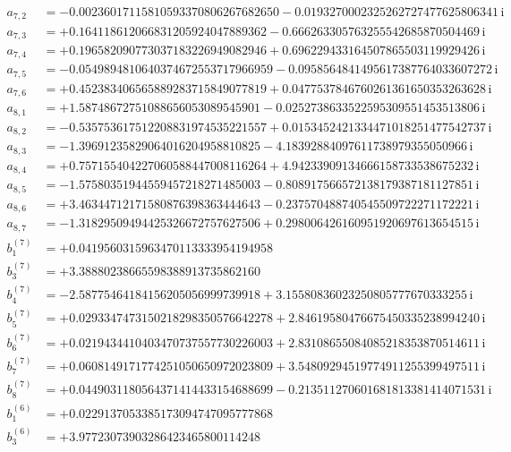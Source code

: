 {\begin{align*}
a_{7,2} &= -0.00236017115810593370806267682650 - 0.0193270002325262727477625806341\,\mathrm{i}\\
a_{7,3} &= +0.164118612066831205924047889362 - 0.666263305763255542685870504469\,\mathrm{i}\\
a_{7,4} &= +0.196582090773037183226949082946 + 0.696229433164507865503119929426\,\mathrm{i}\\
a_{7,5} &= -0.0549894810640374672553717966959 - 0.0958564841495617387764033607272\,\mathrm{i}\\
a_{7,6} &= +0.452383406565889283715849077819 + 0.0477537846760261361650353263628\,\mathrm{i}\\
a_{8,1} &= +1.58748672751088656053089545901 - 0.0252738633522595309551453513806\,\mathrm{i}\\
a_{8,2} &= -0.535753617512208831974535221557 + 0.0153452421334471018251477542737\,\mathrm{i}\\
a_{8,3} &= -1.39691235829064016204958810825 - 4.18392884097611738979355050966\,\mathrm{i}\\
a_{8,4} &= +0.757155404227060588447008116264 + 4.94233909134666158733538675232\,\mathrm{i}\\
a_{8,5} &= -1.57580351944559457218271485003 - 0.808917566572138179387181127851\,\mathrm{i}\\
a_{8,6} &= +3.46344712171580876398363444643 - 0.237570488740545509722271172221\,\mathrm{i}\\
a_{8,7} &= -1.31829509494425326672757627506 + 0.298006426160951920697613654515\,\mathrm{i}\\[1mm]
b^{(7)}_{1} &= +0.0419560315963470113333954194958\\
b^{(7)}_{3} &= +3.38880238665598388913735862160\\
b^{(7)}_{4} &= -2.58775464184156205056999739918 + 3.15580836023250805777670333255\,\mathrm{i}\\
b^{(7)}_{5} &= +0.0293347473150218298350576642278 + 2.84619580476675450335238994240\,\mathrm{i}\\
b^{(7)}_{6} &= +0.0219434410403470737557730226003 + 2.83108655084085218353870514611\,\mathrm{i}\\
b^{(7)}_{7} &= +0.0608149171774251050650972023809 + 3.54809294519774911255399497511\,\mathrm{i}\\
b^{(7)}_{8} &= +0.0449031180564371414433154688699 - 0.213511270601681813381414071531\,\mathrm{i}\\[1mm]
b^{(6)}_{1} &= +0.0229137053385173094747095777868\\
b^{(6)}_{3} &= +3.97723073903286423465800114248\\

\end{align*}}
